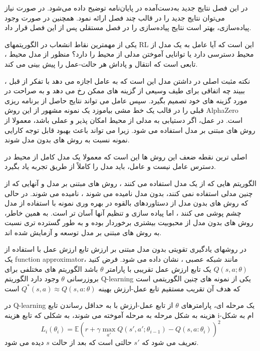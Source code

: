 
در این فصل نتایج جدید به‌دست‌آمده در پایان‌نامه توضیح داده می‌شود.
در صورت نیاز می‌توان نتایج جدید را در قالب چند فصل ارائه نمود.
همچنین در صورت وجود پیاده‌سازی، بهتر است نتایج پیاده‌سازی را 
در فصل مستقلی پس از این فصل قرار داد.




یکی از مهمترین نقاط انشعاب در الگوریتم\nf های RL این است که آیا عامل به یک مدل از محیط دسترسی دارد یا  توانایی آموختن مدلی از محیط را دارد؟ منظور از مدل محیط ، تابعی است که انتقال و پاداش هر حالت-عمل را پیش بینی می کند.

نکته مثبت اصلی در داشتن مدل این است که به عامل اجازه می دهد با تفکر از قبل ، ببیند چه اتفاقی برای طیف وسیعی از گزینه های ممکن رخ می دهد و به صراحت در مورد گزینه های خود تصمیم بگیرد. سپس عامل می تواند نتایج حاصل از برنامه ریزی قبلی را در قالب یک خط مشی بیاموزد یک نمونه مشهور از این روش AlphaZero است. در عمل، اگر دستیابی به مدلی از محیط امکان پذیر و عملی باشد، معمولا از روش های مبتنی بر مدل استفاده می شود. زیرا می تواند باعث بهبود قابل توجه کارایی نمونه نسبت به روش های بدون مدل شوند.

اصلی ترین نقطه ضعف این روش ها این است که معمولا یک مدل کامل از محیط  در دسترس عامل نیست و عامل، باید مدل را کاملاً از طریق تجربه یاد بگیرد.

الگوریتم هایی که از یک مدل استفاده می کنند ، روش های مبتنی بر مدل و آنهایی که از چنین مدلی استفاده نمی کنند، بدون مدل نامیده می شوند ، نامیده می شوند. در حالی که روش های بدون مدل از دستاوردهای بالقوه در بهره وری نمونه با استفاده از مدل چشم پوشی می کنند ، اما پیاده سازی و تنظیم آنها آسان تر است. به همین خاطر، روش های بدون مدل از محبوبیت بیشتری برخوردار بوده و به طور گسترده تری نسبت به روش های مبتنی بر مدل توسعه و آزمایش شده اند.




در روشهای یادگیری تقویتی بدون مدل مبتنی بر ارزش
تابع ارزش عمل با استفاده از  یک function approximator، مانند شبکه عصبی ، نشان داده می شود. فرض کنید
$Q(s,a;\theta)$
یک تابع ارزش عمل تقریبی با پارامتر 
$\theta$
باشد
الگوریتم های مختلفی برای بروزرسانی $\theta$ وجود دارد
الگوریتم Q-learning یکی از نمونه های چنین الگوریتمی است
که هدف آن تقریب مستقیم تابع عمل-ارزش بهینه 
$Q^*(s,a) \approx Q(s,a: \theta)$
 است

در Q-learning یک مرحله ای، پارامترهای $\theta$ از تابع عمل-ارزش با به حداقل رساندن تابع هزینه به شکل مرحله به مرحله آموخته می شوند، به شکلی که تابع هزینه i-ام به شکل 
$$L_i(\theta_i) = \mathbb{E} {\left( r+\gamma \max_{a'} Q(s',a'; \theta_{i-1})- Q(s,a:\theta_i) \right)}^2$$
 تعریف می شود که 
 $s'$
 حالتی است که بعد از حالت $s$ دیده می شود.

